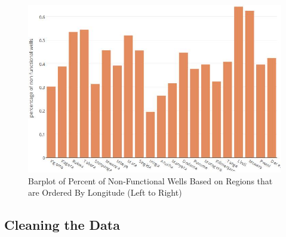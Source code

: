 \documentclass[10pt]{SelfArx} %
\begin{document}
\setlength{\belowcaptionskip}{-15pt}
\begin{figure}[ht]\centering
\includegraphics[width=\linewidth]{barplot2.png}
\caption{Barplot of Percent of Non-Functional Wells Based on Regions that are Ordered By Longitude (Left to Right)}
\label{fig:barplot}
\end{figure}

\subsection{Cleaning the Data}
\end{document}
